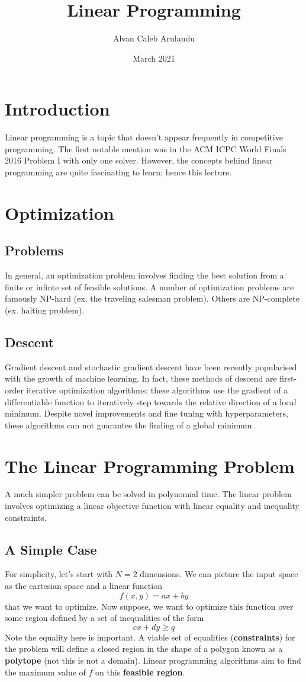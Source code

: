 \documentclass{article}
\title{Linear Programming}
\author{Alvan Caleb Arulandu}
\date{March 2021}
\begin{document}
\maketitle

\section{Introduction}
Linear programming is a topic that doesn't appear frequently in competitive programming.
The first notable mention was in the ACM ICPC World Finals 2016 Problem I with only one solver.
However, the concepts behind linear programming are quite fascinating to learn; hence this lecture.

\section{Optimization}
\subsection{Problems}
In general, an optimization problem involves finding the best solution from a finite or infinte set of
feasible solutions. A number of optimization problems are famously NP-hard (ex. the traveling salesman problem).
Others are NP-complete (ex. halting problem).

\subsection{Descent}
Gradient descent and stochastic gradient descent have been recently popularised with the growth of machine learning.
In fact, these methods of descend are first-order iterative optimization algorithms; these algorithms use the gradient
of a differentiable function to iteratively step towards the relative direction of a local minimum. 
Despite novel improvements and fine tuning with hyperparameters, these algorithms can not guarantee the finding of a
global minimum.

\section{The Linear Programming Problem}
A much simpler problem can be solved in polynomial time. The linear problem involves optimizing a linear objective
function with linear equality and inequality constraints. 

\subsection{A Simple Case}
For simplicity, let's start with $N=2$ dimensions. We can picture the input space as the cartesian space and a linear function
$$f(x,y)=ax+by$$
that we want to optimize.
Now suppose, we want to optimize this function over some region defined by a set of inequalities of the form
$$cx+dy\geq q$$
Note the equality here is important. A viable set of equalities (\textbf{constraints}) for the problem will define a closed region in
the shape of a polygon known as a \textbf{polytope} (not this is not a domain). Linear programming algorithms 
aim to find the maximum value of $f$ on this \textbf{feasible region}.
\end{document}
